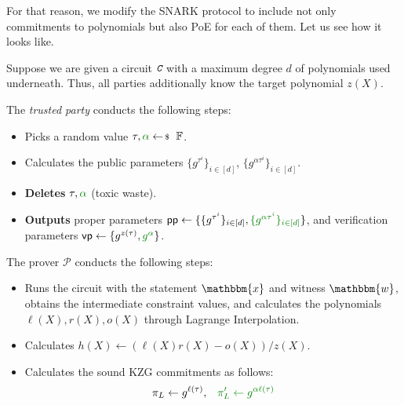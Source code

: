 \documentclass[../lecture-notes-148x210.tex]{subfiles}
\begin{document}
For that reason, we modify the SNARK protocol to include not only commitments to polynomials but also PoE for each of them. Let us see how it looks like.

\begin{tcolorbox}[title=Attempt \#2: SNARK with PoE included,
    breakable,
    colback=blue!5!white,
    colframe=blue!75!black,
    colbacktitle=blue!25!white,
    coltitle=blue!20!black,
    fonttitle=\bfseries,
    boxrule=1.25pt,
    subtitle style={boxrule=0pt,
    colback=blue!20!white,
    colupper=blue!75!gray} ]

    Suppose we are given a circuit $\textit{\texttt{C}}$ with a maximum degree $d$ of polynomials used underneath. Thus, all parties additionally know the target polynomial $z(X)$.

    The \emph{trusted party} conducts the following steps:
    \begin{itemize}[label=]
        \item Picks a random value $\tau, \textcolor{green!50!black}{\alpha} \leftarrowS \mathbb{F}$.
        \item Calculates the public parameters $\{g^{\tau^i}\}_{i \in [d]}$, \textcolor{green!50!black}{$\{g^{\alpha\tau^i}\}_{i \in [d]}$}.
        \item \textbf{Deletes} $\tau, \textcolor{green!50!black}{\alpha}$ (toxic waste).
        \item \textbf{Outputs} proper parameters $\mathsf{pp}\gets\{\{g^{\tau^i}\}_{i \in [d]}, \textcolor{green!50!black}{\{g^{\alpha\tau^i}\}_{i \in [d]}}\}$, and verification parameters $\mathsf{vp} \gets \{g^{z(\tau)}, \textcolor{green!50!black}{g^{\alpha}}\}$.
    \end{itemize}
    The prover $\mathcal{P}$ conducts the following steps:
    \begin{itemize}[label=]
        \item Runs the circuit with the statement $\mathbbm{x}$ and witness $\mathbbm{w}$, obtains the intermediate constraint values, and calculates the polynomials $\ell(X), r(X), o(X)$ through Lagrange Interpolation.
        \item Calculates $h(X) \gets (\ell(X)r(X) - o(X))\big/ z(X)$.
        \item Calculates the sound KZG commitments as follows: 
        \begin{align*}
            \pi_L \gets g^{\ell(\tau)}, & \quad\textcolor{green!50!black}{\pi_L' \gets g^{\alpha \ell(\tau)}} \\

\end{align*}
\end{itemize}
\end{tcolorbox}
\end{document}
